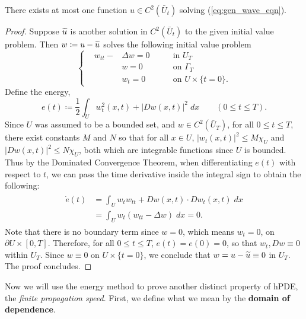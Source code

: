 \documentclass{article}
\numberwithin{equation}{section}
\begin{document}
	\begin{theorem}
		There exists at most one function $u \in C^2(\bar{U}_t)$ solving (\ref{eq:gen_wave_eqn}). 
	\end{theorem}
	\begin{proof}
		Suppose $\widetilde{u}$ is another solution in $C^{2}(\bar{U}_t)$ to the given initial value problem. Then $w \coloneqq u - \widetilde{u}$ solves the following initial value problem 
		\begin{equation*}
			\left\{
			\begin{alignedat}{3}
				&w_{tt} - &\Delta w  = 0 \qquad &\text{in $U_T$} \\
				&\quad &w = 0 \qquad &\text{on $\Gamma_T$} \\
				&\quad &w_t = 0 \qquad &\text{on $U \times \{t = 0\}$}. 
			\end{alignedat}
			\right.
		\end{equation*} 
		Define the energy, 
		\begin{equation*}
			e(t) \coloneqq \frac{1}{2}\int_{U}w_t^2(x,t) + |Dw(x,t)|^2\;dx \qquad (0 \leq t \leq T). 
		\end{equation*}
		Since $U$ was assumed to be a bounded set, and $w \in C^{2}(\bar{U}_{T})$, for all $0 \leq t \leq T$, there exist constants $M$ and $N$ so that for all $x \in U$, $|w_t(x,t)|^2 \leq M\chi_U$ and $|Dw(x,t)|^2 \leq N\chi_{U}$, both which are integrable functions since $U$ is bounded. Thus by the Dominated Convergence Theorem, when differentiating $e(t)$ with respect to $t$, we can pass the time derivative inside the integral sign to obtain the following: 
		\begin{align*}
			\begin{split}
				\dot{e}(t) &= \int_{U}w_tw_{tt} + Dw(x,t) \cdot Dw_t(x,t)\;dx \\
				&= \int_U w_t(w_{tt} - \Delta w)\;dx = 0. 
			\end{split}
		\end{align*}
		Note that there is no boundary term since $w = 0$, which means $w_t = 0$, on $\partial U \times [0, T]$. Therefore, for all $0 \leq t \leq T$, $e(t) = e(0) =0$, so that $w_t, Dw \equiv 0$ within $U_T$. Since $w \equiv 0$ on $U \times \{t = 0\}$, we conclude that $w = u - \widetilde{u} \equiv 0$ in $U_T$. The proof concludes. 
	\end{proof}
	
	Now we will use the energy method to prove another distinct property of hPDE, the \textit{finite propagation speed}. First, we define what we mean by the \textbf{domain of dependence}. 
	
\end{document}
